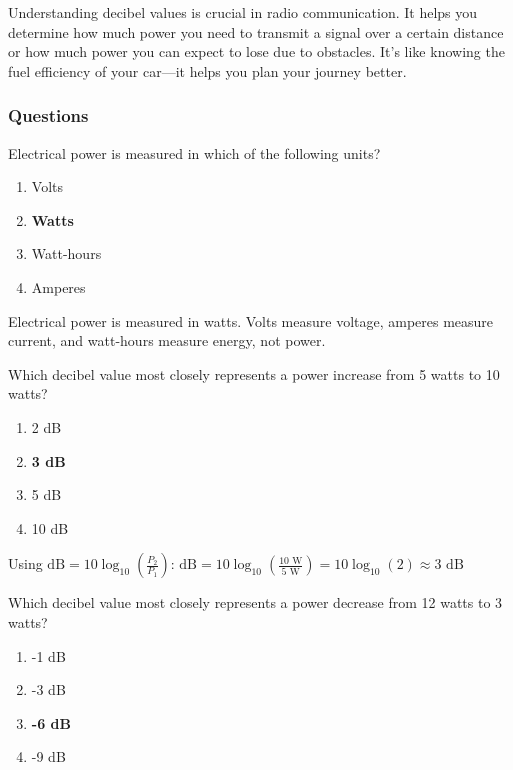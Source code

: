 Understanding decibel values is crucial in radio communication. It helps you determine how much power you need to transmit a signal over a certain distance or how much power you can expect to lose due to obstacles. It's like knowing the fuel efficiency of your car—it helps you plan your journey better.


\subsubsection*{Questions}
\begin{tcolorbox}[colback=gray!10!white,colframe=black!75!black,title={T5A02}]
Electrical power is measured in which of the following units?
\begin{enumerate}[label=\Alph*),noitemsep]
    \item Volts
    \item \textbf{Watts}
    \item Watt-hours
    \item Amperes
\end{enumerate}
\end{tcolorbox}
Electrical power is measured in watts. Volts measure voltage, amperes measure current, and watt-hours measure energy, not power.

\begin{tcolorbox}[colback=gray!10!white,colframe=black!75!black,title={T5B09}]
Which decibel value most closely represents a power increase from 5 watts to 10 watts?
\begin{enumerate}[label=\Alph*),noitemsep]
    \item 2 dB
    \item \textbf{3 dB}
    \item 5 dB
    \item 10 dB
\end{enumerate}
\end{tcolorbox}

Using $\text{dB} = 10 \log_{10}(\frac{P_2}{P_1})$:
$\text{dB} = 10 \log_{10}(\frac{10\text{ W}}{5\text{ W}}) = 10 \log_{10}(2) \approx 3\text{ dB}$

\begin{tcolorbox}[colback=gray!10!white,colframe=black!75!black,title={T5B10}]
Which decibel value most closely represents a power decrease from 12 watts to 3 watts?
\begin{enumerate}[label=\Alph*),noitemsep]
    \item -1 dB
    \item -3 dB
    \item \textbf{-6 dB}
    \item -9 dB
\end{enumerate}
\end{tcolorbox}


